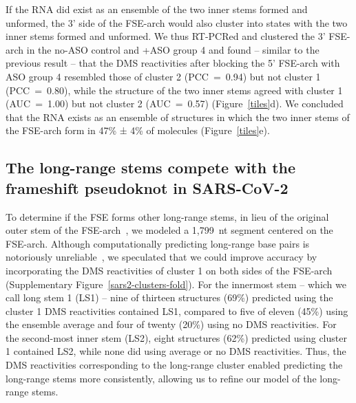 \documentclass[main.tex]{subfiles}
\begin{document}
If the RNA did exist as an ensemble of the two inner stems formed and unformed, the 3' side of the FSE-arch would also cluster into states with the two inner stems formed and unformed.
We thus RT-PCRed and clustered the 3' FSE-arch in the no-ASO control and +ASO group 4 and found -- similar to the previous result -- that the DMS reactivities after blocking the 5' FSE-arch with ASO group 4 resembled those of cluster 2 (PCC~=~0.94) but not cluster 1 (PCC~=~0.80), while the structure of the two inner stems agreed with cluster 1 (AUC~=~1.00) but not cluster 2 (AUC~=~0.57) (Figure~\ref{tiles}d).
We concluded that the RNA exists as an ensemble of structures in which the two inner stems of the FSE-arch form in 47\% ± 4\% of molecules (Figure~\ref{tiles}e).

\subsection{The long-range stems compete with the frameshift pseudoknot in SARS-CoV-2}

To determine if the FSE forms other long-range stems, in lieu of the original outer stem of the FSE-arch~\cite{Ziv2020}, we modeled a 1,799~nt segment centered on the FSE-arch.
Although computationally predicting long-range base pairs is notoriously unreliable~\cite{Doshi2004,Nicholson2015}, we speculated that we could improve accuracy by incorporating the DMS reactivities of cluster 1 on both sides of the FSE-arch (Supplementary Figure~\ref{sars2-clusters-fold}).
For the innermost stem -- which we call long stem 1 (LS1) -- nine of thirteen structures (69\%) predicted using the cluster 1 DMS reactivities contained LS1, compared to five of eleven (45\%) using the ensemble average and four of twenty (20\%) using no DMS reactivities.
For the second-most inner stem (LS2), eight structures (62\%) predicted using cluster 1 contained LS2, while none did using average or no DMS reactivities.
Thus, the DMS reactivities corresponding to the long-range cluster enabled predicting the long-range stems more consistently, allowing us to refine our model of the long-range stems.
\end{document}
